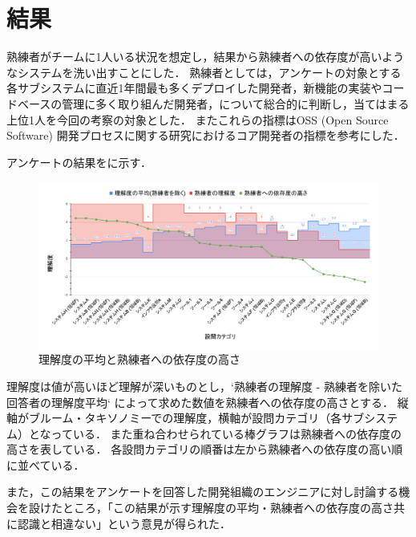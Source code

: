 \section{結果}
熟練者がチームに1人いる状況を想定し，結果から熟練者への依存度が高いようなシステムを洗い出すことにした．
熟練者としては，アンケートの対象とする各サブシステムに直近1年間最も多くデプロイした開発者，新機能の実装やコードベースの管理に多く取り組んだ開発者，について総合的に判断し，当てはまる上位1人を今回の考察の対象とした．
またこれらの指標はOSS (Open Source Software) 開発プロセスに関する研究\cite{bib:mockus}におけるコア開発者の指標を参考にした．

アンケートの結果をに示す．

\begin{figure}[h]
	\centering
	\includegraphics[keepaspectratio,width=0.9\linewidth]{img/rikai.png}
	\caption{理解度の平均と熟練者への依存度の高さ}
	\label{img:rikai}
\end{figure}

理解度は値が高いほど理解が深いものとし，`熟練者の理解度 - 熟練者を除いた回答者の理解度平均` によって求めた数値を熟練者への依存度の高さとする．
縦軸がブルーム・タキソノミーでの理解度，横軸が設問カテゴリ（各サブシステム）となっている．
また重ね合わせられている棒グラフは熟練者への依存度の高さを表している．
各設問カテゴリの順番は左から熟練者への依存度の高い順に並べている．

また，この結果をアンケートを回答した開発組織のエンジニアに対し討論する機会を設けたところ，「この結果が示す理解度の平均・熟練者への依存度の高さ共に認識と相違ない」という意見が得られた．
